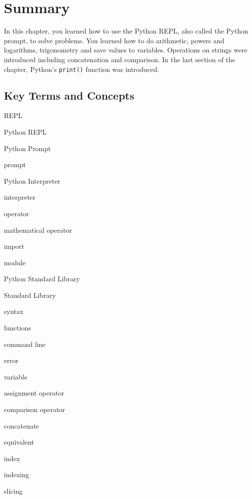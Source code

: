 \documentclass{book}
\newenvironment{key_terms}{\begin{multicols}{3}}{\end{multicols}} %
\newcommand{\passthrough}[1]{#1}
\begin{document}
    
        \newpage
        \hypertarget{summary}{%
\section{Summary}\label{summary}}

    




    
        In this chapter, you learned how to use the Python REPL, also called the
Python prompt, to solve problems. You learned how to do arithmetic,
powers and logarithms, trigonometry and save values to variables.
Operations on strings were introduced including concatenation and
comparison. In the last section of the chapter, Python's
\passthrough{\lstinline!print()!} function was introduced.
    




    
        \hypertarget{key-terms-and-concepts}{%
\subsection{Key Terms and Concepts}\label{key-terms-and-concepts}}
    




    
        \begin{key_terms}
        REPL

Python REPL

Python Prompt

prompt

Python Interpreter

interpreter

operator

mathematical operator

import

module

Python Standard Library

Standard Library

syntax

functions

command line

error

variable

assignment operator

comparison operator

concatenate

equivalent

index

indexing

slicing
        \end{key_terms}
\end{document}
